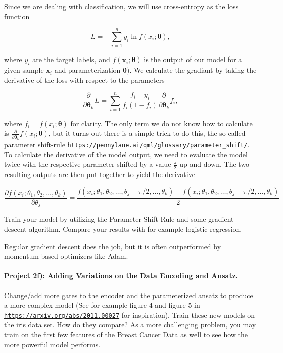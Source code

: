 \documentclass[%
oneside,                 %
final,                   %
10pt]{article}
\begin{document}
Since we are dealing with classification, we will use cross-entropy as the loss function

\begin{equation*}
    L = -\sum_{i=1}^{n}{y_i \ln{f(x_i;\boldsymbol{\theta})}},
\end{equation*}

where $y_i$ are the target labels, and
$f(\boldsymbol{x}_i;\boldsymbol{\theta})$ is the output of our model
for a given sample $\boldsymbol{x}_i$ and parameterization
$\boldsymbol{\theta})$. We calculate the gradiant by taking the
derivative of the loss with respect to the parameters

\begin{equation*}
    \frac{\partial}{\partial \boldsymbol{\theta}_k}L = \sum_{i=1}^{n}{\frac{f_i - y_i}{f_i(1 - f_i)}} \frac{\partial}{\partial \boldsymbol{\theta}_k}f_i,
\end{equation*}

where $f_i = f(x_i;\boldsymbol{\theta})$ for clarity. The only term we do not know how to calculate is $\frac{\partial}{\partial \boldsymbol{\theta}_k}f(x_i;\boldsymbol{\theta})$, but it turns out there is a simple trick to do this, the so-called parameter shift-rule \href{{https://pennylane.ai/qml/glossary/parameter_shift/}}{\nolinkurl{https://pennylane.ai/qml/glossary/parameter_shift/}}. To calculate the derivative of the model output, we need to evaluate the model twice with the respective parameter shifted by a value $\frac{\pi}{2}$ up and down. The two resulting outputs are then put together to yield the derivative

\begin{equation*}
    \frac{\partial f(x_i; \theta_1, \theta_2, \dots, \theta_k)}{\partial \theta_j}  = \frac{f(x_i; \theta_1, \theta_2, \dots, \theta_j + \pi /2, \dots, \theta_k) -f(x_i; \theta_1, \theta_2, \dots, \theta_j - \pi /2, \dots, \theta_k)}{2}
\end{equation*}

Train your model by utilizing the Parameter Shift-Rule and some
gradient descent algorithm. Compare your results with for example
logistic regression.

Regular gradient descent does the job, but it is often outperformed by momentum based optimizers like Adam.

\paragraph{Project 2f): Adding Variations on the Data Encoding and Ansatz.}
Change/add more gates to the encoder and the parameterized ansatz to produce a more complex model (See for example figure 4 and figure 5 in \href{{https://arxiv.org/abs/2011.00027}}{\nolinkurl{https://arxiv.org/abs/2011.00027}} for inspiration). Train these new models on the iris data set. How do they compare? As a more challenging problem, you may train on the first few features of the Breast Cancer Data as well to see how the more powerful model performs.
\end{document}
